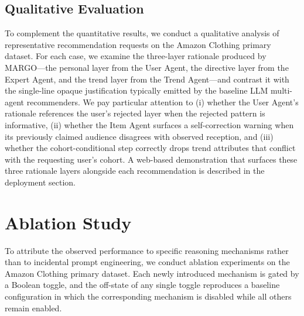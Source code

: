 \documentclass[master,english,final]{postech-ucs}
\begin{document}
\subsection{Qualitative Evaluation}

To complement the quantitative results, we conduct a qualitative analysis of representative recommendation requests on the Amazon Clothing primary dataset.
For each case, we examine the three-layer rationale produced by MARGO---the personal layer from the User Agent, the directive layer from the Expert Agent, and the trend layer from the Trend Agent---and contrast it with the single-line opaque justification typically emitted by the baseline LLM multi-agent recommenders.
We pay particular attention to (i) whether the User Agent's rationale references the user's rejected layer when the rejected pattern is informative, (ii) whether the Item Agent surfaces a self-correction warning when its previously claimed audience disagrees with observed reception, and (iii) whether the cohort-conditional step correctly drops trend attributes that conflict with the requesting user's cohort.
A web-based demonstration that surfaces these three rationale layers alongside each recommendation is described in the deployment section.

\section{Ablation Study}

To attribute the observed performance to specific reasoning mechanisms rather than to incidental prompt engineering, we conduct ablation experiments on the Amazon Clothing primary dataset.
Each newly introduced mechanism is gated by a Boolean toggle, and the off-state of any single toggle reproduces a baseline configuration in which the corresponding mechanism is disabled while all others remain enabled.
\end{document}
